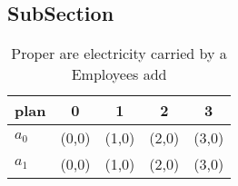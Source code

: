 \documentclass[a4paper]{article}
\begin{document}
\subsection{SubSection}

\begin{table}
\begin{adjustbox}{width=0.8\columnwidth}
\begin{tabular}{|l|l|l|l|l|}
\hline
\textbf{plan} & \multicolumn{1}{c|}{\textbf{0}} & \multicolumn{1}{c|}{\textbf{1}} & \multicolumn{1}{c|}{\textbf{2}} & \multicolumn{1}{c|}{\textbf{3}} \\ \hline
\textbf{$a_0$}  & (0,0) & (1,0) & (2,0) & (3,0) \\ \hline
\textbf{$a_1$}  & (0,0) & (1,0) & (2,0) & (3,0) \\ \hline
\end{tabular}
\end{adjustbox}
\caption{Proper are electricity carried by a Employees add
}
\end{table}
\end{document}

